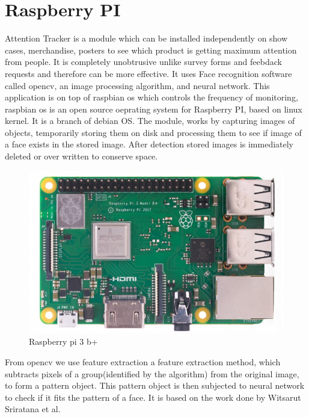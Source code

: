 \section{Raspberry PI}
Attention Tracker is a module which can be installed independently on show cases, merchandise, posters to see which product is getting maximum attention from people. It is completely unobtrusive unlike survey forms and feebdack requests and therefore can be more effective. It uses Face recognition software called opencv, an image processing algorithm, and neural network. This application is on top of
raspbian os which controls the frequency of monitoring, raspbian os is an open source oeprating system for Raspberry PI, based on linux kernel. It is a branch of debian OS. The module, works by capturing images of objects, temporarily storing them on disk and processing them to see if image of a face exists in the stored image. After detection stored images is immediately deleted or over written to conserve space. 

\begin{figure}[!ht]
\centering
\includegraphics[scale=0.7]{raspberrypi}
\caption{Raspberry pi 3 b+}
\end{figure}


From opencv we use feature extraction a feature extraction method, which subtracts pixels of a group(identified by the algorithm) from
the original image, to form a pattern object. This pattern object is then subjected to neural network to check if it fits the pattern of a face. It is based on the work done by Witsarut Sriratana et al\cite{opencv}.
